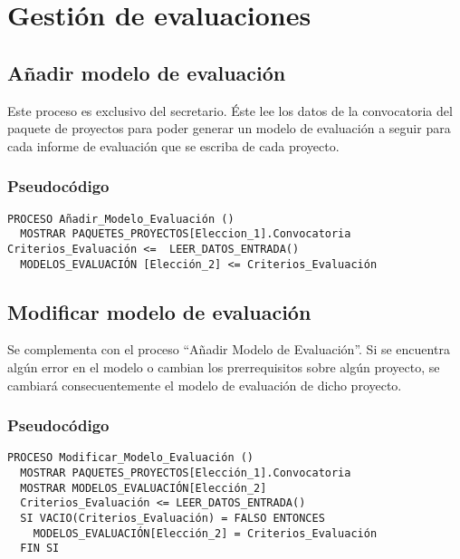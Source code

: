 \documentclass[12pt,a4paper,spanish,twoside]{book}
\begin{document}
\section{Gestión de evaluaciones}

\subsection{Añadir modelo de evaluación}
Este proceso es exclusivo del secretario. Éste lee los datos de la convocatoria 
del paquete de proyectos para poder generar un modelo de evaluación a seguir 
para cada informe de evaluación que se escriba de cada proyecto.

\subsubsection{Pseudocódigo}
\begin{lstlisting}[inputencoding=utf8/latin1]
PROCESO Añadir_Modelo_Evaluación ()
  MOSTRAR PAQUETES_PROYECTOS[Eleccion_1].Convocatoria  Criterios_Evaluación <=  LEER_DATOS_ENTRADA()
  MODELOS_EVALUACIÓN [Elección_2] <= Criterios_Evaluación
\end{lstlisting}

\subsection{Modificar modelo de evaluación}
Se complementa con el proceso ``Añadir Modelo de Evaluación''. Si se encuentra 
algún error en el modelo o cambian los prerrequisitos sobre algún proyecto, se 
cambiará consecuentemente el modelo de evaluación de dicho proyecto.

\subsubsection{Pseudocódigo}
\begin{lstlisting}[inputencoding=utf8/latin1]
PROCESO Modificar_Modelo_Evaluación ()
  MOSTRAR PAQUETES_PROYECTOS[Elección_1].Convocatoria
  MOSTRAR MODELOS_EVALUACIÓN[Elección_2]
  Criterios_Evaluación <= LEER_DATOS_ENTRADA()
  SI VACIO(Criterios_Evaluación) = FALSO ENTONCES
    MODELOS_EVALUACIÓN[Elección_2] = Criterios_Evaluación
  FIN SI
\end{lstlisting}
\end{document}
